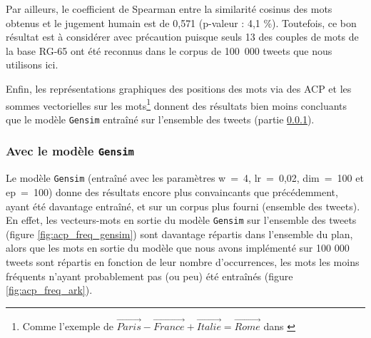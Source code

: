 \documentclass[11pt,french,french]{article}
\let\rmarkdownfootnote\footnote%
\def\footnote{\protect\rmarkdownfootnote}
\begin{document}
Par ailleurs, le coefficient de Spearman entre la similarité cosinus des
mots obtenus et le jugement humain est de 0,571 (p-valeur : 4,1 \%).
Toutefois, ce bon résultat est à considérer avec précaution puisque
seuls 13 des couples de mots de la base RG-65 ont été reconnus dans le
corpus de 100~000 tweets que nous utilisons ici.

Enfin, les représentations graphiques des positions des mots via des ACP
et les sommes vectorielles sur les mots\footnote{Comme l'exemple de
  \(\overrightarrow{Paris} - \overrightarrow{France} + \overrightarrow{Italie} = \overrightarrow{Rome}\)
  dans \cite{Mikolov}} donnent des résultats bien moins concluants que
le modèle \texttt{Gensim} entraîné sur l'ensemble des tweets (partie
\ref{sec:gensimresultats}).

\subsubsection{\texorpdfstring{Avec le modèle
\texttt{Gensim}}{Avec le modèle Gensim}}\label{sec:gensimresultats}

Le modèle \texttt{Gensim} (entraîné avec les paramètres w~=~4,
lr~=~0,02, dim~=~100 et ep~=~100) donne des résultats encore plus
convaincants que précédemment, ayant été davantage entraîné, et sur un
corpus plus fourni (ensemble des tweets). En effet, les vecteurs-mots en
sortie du modèle \texttt{Gensim} sur l'ensemble des tweets (figure
\ref{fig:acp_freq_gensim}) sont davantage répartis dans l'ensemble du
plan, alors que les mots en sortie du modèle que nous avons implémenté
sur 100 000 tweets sont répartis en fonction de leur nombre
d'occurrences, les mots les moins fréquents n'ayant probablement pas (ou
peu) été entraînés (figure \ref{fig:acp_freq_ark}).
\end{document}
